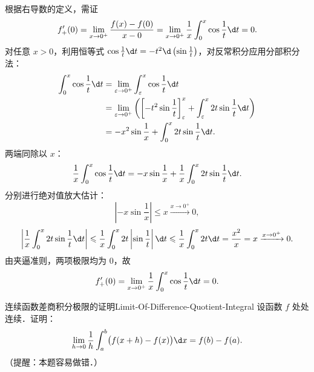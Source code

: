 \begin{solution}
    根据右导数的定义，需证
    \begin{equation}
        f'_+(0) = \lim_{x\to 0^+} \frac{f(x) - f(0)}{x - 0} = \lim_{x\to 0^+} \frac{1}{x} \int_0^x \cos \frac{1}{t} \d t = 0.
    \end{equation}
    对任意 $x > 0$，利用恒等式 $\cos\frac{1}{t}\d t = -t^2 \d\left(\sin\frac{1}{t}\right)$，对反常积分应用分部积分法：
    \begin{equation}
        \begin{aligned}
            \int_0^x \cos \frac{1}{t} \d t & = \lim_{\varepsilon\to 0^+} \int_\varepsilon^x \cos \frac{1}{t} \d t                                                                      \\
                                           & = \lim_{\varepsilon\to 0^+} \left( \left[ -t^2 \sin\frac{1}{t} \right]_\varepsilon^x + \int_\varepsilon^x 2t \sin\frac{1}{t} \d t \right) \\
                                           & = -x^2 \sin\frac{1}{x} + \int_0^x 2t \sin\frac{1}{t} \d t.
        \end{aligned}
    \end{equation}
    两端同除以 $x$：
    \begin{equation}
        \frac{1}{x}\int_0^x \cos \frac{1}{t} \d t = -x \sin\frac{1}{x} + \frac{1}{x} \int_0^x 2t \sin\frac{1}{t} \d t.
    \end{equation}
    分别进行绝对值放大估计：
    \begin{equation}
        \left| -x \sin\frac{1}{x} \right| \leqslant x \xrightarrow{x\to 0^+} 0,
    \end{equation}
    \begin{equation}
        \left| \frac{1}{x}\int_0^x 2t \sin\frac{1}{t} \d t \right| \leqslant \frac{1}{x} \int_0^x 2t \left|\sin\frac{1}{t}\right| \d t \leqslant \frac{1}{x} \int_0^x 2t \d t = \frac{x^2}{x} = x \xrightarrow{x\to 0^+} 0.
    \end{equation}
    由夹逼准则，两项极限均为 $0$，故
    \begin{equation}
        f'_+(0) = \lim_{x\to 0^+} \frac{1}{x}\int_0^x \cos\frac{1}{t}\d t = 0.
    \end{equation}
\end{solution}

\begin{problem}{连续函数差商积分极限的证明}{Limit-Of-Difference-Quotient-Integral}
    设函数 $f$ 处处连续．证明：
    \begin{equation}
        \lim_{h\to 0} \frac{1}{h}\int_a^b \bigl(f(x + h) - f(x)\bigr) \d x = f(b) - f(a).
    \end{equation}
    （提醒：本题容易做错．）
\end{problem}

